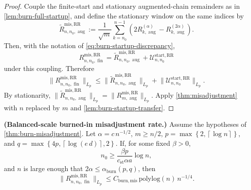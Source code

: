 \begin{proof} Couple the finite-start and stationary augmented-chain remainders as
in \cref{lem:burn-full-startup}, and define the stationary window on the same
indices by
\[
\tilde{R}_{n,n_{0}, \operatorname{aug}}^{\mathrm{mis,RR}}
  := \frac{1}{\sqrt{m}} \sum_{k = n_{0}}^{n - 1}
    \left( 2 R_{k, \operatorname{aug}}^{(\alpha)}
        - R_{k, \operatorname{aug}}^{(2 \alpha)} \right).
\]
Then, with the notation of \eqref{eq:burn-startup-discrepancy},
\[
R_{n,n_{0}, \operatorname{fin}}^{\mathrm{mis,RR}}
  = \tilde{R}_{n,n_{0}, \operatorname{aug}}^{\mathrm{mis,RR}}
    + \mathcal{U}_{n,n_{0}}^{\mathrm{start,RR}}
\]
under this coupling. Therefore
\[
\lVert R_{n,n_{0}, \operatorname{fin}}^{\mathrm{mis,RR}} \rVert_{L_{p}}
  \le \lVert \tilde{R}_{n,n_{0}, \operatorname{aug}}^{\mathrm{mis,RR}} \rVert_{L_{p}}
     + \lVert \mathcal{U}_{n,n_{0}}^{\mathrm{start,RR}} \rVert_{L_{p}}.
\]
By stationarity,
$\lVert \tilde{R}_{n,n_{0}, \operatorname{aug}}^{\mathrm{mis,RR}} \rVert_{L_{p}}
  = \lVert R_{m, \operatorname{aug}}^{\mathrm{mis,RR}} \rVert_{L_{p}}$.
Apply \cref{thm:misadjustment} with $n$ replaced by $m$ and
\cref{lem:burn-startup-transfer}. \end{proof}

\begin{corollary}\label{cor:burn-misadjustment-rate}
  \textbf{(Balanced-scale burned-in misadjustment rate.)}
  Assume the hypotheses of \cref{thm:burn-misadjustment}. Let
  $\alpha = c \, n^{-1 / 2}$, $m \ge n / 2$,
  $p = \max\left\{2, \left\lceil \log n \right\rceil\right\}$, and
  $q = \max\left\{4 p, \left\lceil \log\left(e \, d\right) \right\rceil, 2\right\}$. If, for some fixed $\beta > 0$,
  \[
n_{0} \ge \frac{\beta p}{c_{\mathrm{st}} \alpha a} \log n,
\]
  and $n$ is large enough that $2 \alpha \le \alpha_{\mathrm{burn}}(p,q)$, then
  \begin{equation}
\lVert R_{n,n_{0}, \operatorname{fin}}^{\mathrm{mis,RR}} \rVert_{L_{p}}
    \le C_{\mathrm{burn,mis}} \, \mathrm{polylog}(n) \, n^{-1 / 4}.
\label{eq:burn-mis-rate}
\end{equation}
\end{corollary}

